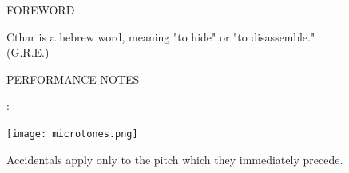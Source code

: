 \documentclass[10pt]{article}
\begin{document}
\vspace*{0.5\baselineskip}

\begin{center}
\huge FOREWORD
\end{center}

\begin{center}
Cthar is a hebrew word, meaning "to hide" or "to disassemble."\\
\phantom{text} \hfill (G.R.E.)
  \end{center}
  
\vspace*{3\baselineskip}

\begin{center}
\huge PERFORMANCE NOTES
\end{center}

\begin{center}
:
\end{center}

\begin{center}
\texttt{[image: microtones.png]}
\end{center}

\begin{center}
Accidentals apply only to the pitch which they immediately precede.
\end{center}
\end{document}
